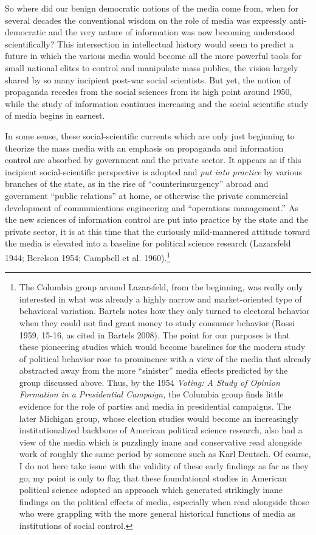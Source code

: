 So where did our benign democratic notions of the media come from, when for several decades the
conventional wisdom on the role of media was expressly anti-democratic and the very nature of
information was now becoming understood scientifically? This intersection in intellectual history
would seem to predict a future in which the various media would become all the more powerful tools
for small national elites to control and manipulate mass publics, the vision largely shared by so
many incipient post-war social scientists. But yet, the notion of propaganda recedes from the social
sciences from its high point around 1950, while the study of information continues increasing and
the social scientific study of media begins in earnest.

In some sense, these social-scientific currents which are only just beginning to theorize the mass
media with an emphasis on propaganda and information control are absorbed by government and the
private sector. It appears as if this incipient social-scientific perspective is adopted and
\emph{put into practice} by various branches of the state, as in the rise of ``counterinsurgency''
abroad and government ``public relations'' at home, or otherwise the private commercial development
of communications engineering and ``operations management.'' As the new sciences of information
control are put into practice by the state and the private sector, it is at this time that the
curiously mild-mannered attitude toward the media is elevated into a baseline for political science
research (Lazarsfeld 1944; Berelson 1954; Campbell et al. 1960).\footnote{The Columbia group
around Lazarsfeld, from the beginning, was really only interested in what was already a highly
narrow and market-oriented type of behavioral variation. Bartels notes how they only turned to
electoral behavior when they could not find grant money to study consumer behavior (Rossi 1959,
15-16, as cited in Bartels 2008). The point for our purposes is that these pioneering studies which
would become baselines for the modern study of political behavior rose to prominence with a view of
the media that already abstracted away from the more ``sinister'' media effects predicted by the
group discussed above. Thus, by the 1954 \emph{Voting: A Study of Opinion Formation in a
Presidential Campaign, }the Columbia group finds little evidence for the role of parties and media
in presidential campaigns. The later Michigan group, whose election studies would become an
increasingly institutionalized backbone of American political science research, also had a view of
the media which is puzzlingly inane and conservative read alongside work of roughly the same period
by someone such as Karl Deutsch. Of course, I do not here take issue with the validity of these
early findings as far as they go; my point is only to flag that these foundational studies in
American political science adopted an approach which generated strikingly inane findings on the
political effects of media, especially when read alongside those who were grappling with the more
general historical functions of media as institutions of social control.} 

